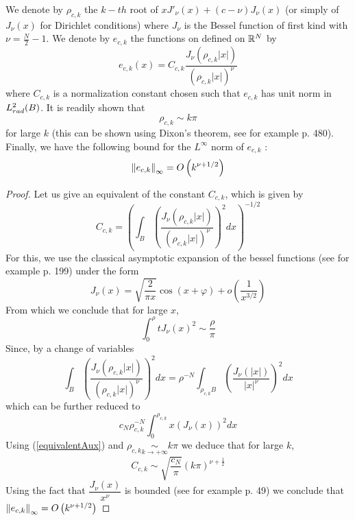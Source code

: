 \documentclass[11pt,a4paper]{article}
\begin{document}
\begin{Def} We denote by $\rho_{c,k}$ the $k-th$ root of $x J'_\nu(x) + (c - \nu) J_\nu(x)$ (or simply of $J_\nu(x)$ for Dirichlet conditions) where $J_\nu$ is the Bessel function of first kind with $\nu = \frac{N}{2}-1$. We denote by $e_{c,k}$ the functions on defined on $\mathbb{R}^N$ by \[e_{c,k}(x) = C_{c,k} \dfrac{J_{\nu}(\rho_{c,k}|x|)}{(\rho_{c,k}|x|)^\nu}\] where $C_{c,k}$ is a normalization constant chosen such that $e_{c,k}$ has unit norm in $L^2_{rad}(B)$. It is readily shown that \[\rho_{c,k} \sim k\pi \] for large $k$ (this can be shown using Dixon's theorem, see for example \cite{watson1995treatise} p. 480). Finally, we have the following bound for the $L^\infty$ norm of $e_{c,k}$ :  \[ \left\|e_{c,k}\right\|_{\infty} = O\left(k^{\nu + 1/2}\right)\] 


\begin{proof}
Let us give an equivalent of the constant $C_{c,k}$, which is given by 
\[C_{c,k} = \left(\int_{B} \left(\dfrac{J_{\nu}(\rho_{c,k}|x|)}{\left(\rho_{c,k}|x|\right)^\nu}\right)^2dx\right)^{-1/2} \]
For this, we use the classical asymptotic expansion of the bessel functions  (see for example \cite{watson1995treatise} p. 199) under the form 
\[ J_\nu(x) = \sqrt{\dfrac{2}{\pi x}} \cos(x + \varphi) + o\left(\dfrac{1}{x^{3/2}}\right)\]
From which we conclude that for large $x$, 
\begin{equation}
\int_{0}^\rho t J_\nu(x)^2 \sim \dfrac{\rho}{\pi}
\label{equivalentAux}
\end{equation}
Since, by a change of variables \[ \int_{B} \left(\dfrac{J_{\nu}(\rho_{c,k}|x|)}{\left(\rho_{c,k}|x|\right)^\nu}\right)^2dx =   \rho^{-N}\int_{\rho_{c,k}B} \left(\dfrac{J_{\nu}(|x|)}{|x|^\nu}\right)^2dx\]
which can be further reduced to 
\[ c_N \rho_{c,k}^{-N} \int_{0}^{\rho_{c,k}} x \left(J_\nu(x)\right)^2dx\]
Using (\ref{equivalentAux}) and $\rho_{c,k} \underset{k\to +\infty}{\sim }k\pi$ we deduce that for large $k$, \[C_{c,k} \sim \sqrt{\dfrac{c_N}{\pi}}\left(k\pi\right)^{\nu+\frac{1}{2}} \]
Using the fact that $\dfrac{J_{\nu}(x)}{x^\nu}$ is bounded (see for example \cite{watson1995treatise} p. 49) we conclude that $\left\|e_{c,k}\right\|_{\infty} = O\left(k^{\nu+1/2}\right)$
\end{proof}
\end{Def}
\end{document}

